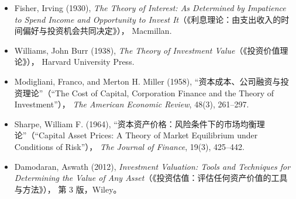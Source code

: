 

\begin{itemize}

\item Fisher, Irving (1930), 
\emph{The Theory of Interest: As Determined by Impatience to Spend Income and Opportunity to Invest It}（《利息理论：由支出收入的时间偏好与投资机会共同决定》），
Macmillan.

\item Williams, John Burr (1938), 
\emph{The Theory of Investment Value}（《投资价值理论》），
Harvard University Press.

\item Modigliani, Franco, and Merton H. Miller (1958), 
“资本成本、公司融资与投资理论”（``The Cost of Capital, Corporation Finance and the Theory of Investment''），
\emph{The American Economic Review}, 48(3), 261--297.

\item Sharpe, William F. (1964), 
“资本资产价格：风险条件下的市场均衡理论”（``Capital Asset Prices: A Theory of Market Equilibrium under Conditions of Risk''），
\emph{The Journal of Finance}, 19(3), 425--442.

\item Damodaran, Aswath (2012), 
\emph{Investment Valuation: Tools and Techniques for Determining the Value of Any Asset}（《投资估值：评估任何资产价值的工具与方法》），
第 3 版，Wiley。

\end{itemize}

